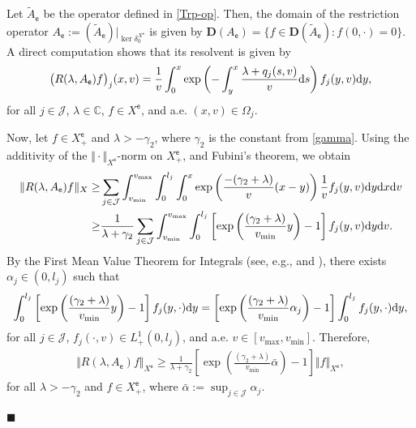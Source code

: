 \documentclass[onecolumn]{autart}
\def\la{\lambda}
\def\calF{{\mathcal{F}}}
\def\C{\mathbb C}
\numberwithin{equation}{section}
\newenvironment{proof}{{\it Proof: \enspace}}{\hfill $\blacksquare$\par}
\begin{document}
	\begin{proof} %
		Let $\tilde{A}_{\mathsf{e}}$ be the operator defined in \eqref{Trp-op}. Then, the domain of the restriction operator ${A}_{\mathsf{e}}:=(\tilde{A}_{\mathsf{e}})\vert_{\ker \delta_{0}^{X^{\mathsf{e}}}}$ is given by
		${\bm D}(A_{\mathsf{e}})= \{ f \in {\bm D}(\tilde{A}_{\mathsf{e}}): f(0,\cdot)=0 \}.$
		A direct computation shows that its resolvent is given by
		\begin{align*}
			\big(R(\lambda,A_{\mathsf{e}}) f\big)_j(x,v)
			= \frac{1}{v} \int_0^x {{\exp}}\left( -\int_y^x \frac{\lambda + q_j(s,v)}{v}  {\rm{d}}s \right) f_j(y,v)  {\rm d}y,
		\end{align*}
		for all $j\in \mathcal{J}$, $\la\in \C$, $f\in X^{\mathsf{e}}$, and a.e. $(x,v)\in \Omega_j$.
		
		Now, let $f\in X_+^{\mathsf{e}}$ and {$\la>-\gamma_2$}, where $\gamma_2$ is the constant from \eqref{gamma}. Using the additivity of the $\Vert\cdot\Vert_{X^{\mathsf{e}}}$-norm on $X_+^{\mathsf{e}}$, and Fubini's theorem, we obtain
		\begin{align*}
			\Vert R(\la,{A}_{{\mathsf{e}}})f\Vert_{X}
			\ge&  \sum_{j\in \mathcal{J}}\int_{v_{\min}}^{v_{\max}}\int_{0}^{l_j} \int_{0}^{x}		{{\exp}}\left(\frac{-(\gamma_2 +\la)}{v}(x-y)\right)\frac{1}{v}f_j(y,v){\rm d}y{\rm d}x{\rm d}v\\
			\ge &	\frac{ 1}{\la +\gamma_2}\sum_{j\in \mathcal{J}}\int_{v_{\min}}^{v_{\max}}\int_{0}^{l_j}     \left[{{\exp}}\left(\frac{(\gamma_2+\la)}{v_{\min}}y\right)-1 \right]f_j(y,v){\rm d}y{\rm d}v.
		\end{align*}
		By the First Mean Value Theorem for Integrals (see, e.g., \cite[Thm. 85.6]{Heuser} and \cite[Rem. 2.1]{Diethelm}), there exists $\alpha_j\in (0,l_j)$ such that
		\begin{align*}
			\displaystyle\int_{0}^{l_j}\left[{{\exp}}\left(\frac{(\gamma_2+\la)}{v_{\min}}y\right)-1\right] f_j(y,\cdot){\rm d}y=
			\left[ {{\exp}}\left(\frac{(\gamma_2+\la)}{v_{\min}}\alpha_j\right)-1\right] \int_{0}^{l_j}f_j(y,\cdot){\rm d}y,
		\end{align*}
		for all $j\in \mathcal{J}$, $ f_j(\cdot,v)\in L^1_+(0,l_j)$, and a.e. $v\in [v_{\max},v_{\min}]$. Therefore,
		\begin{align}\label{inverse-A}
			\Vert R(\la,{A}_{{\mathsf{e}}})f\Vert_{X^{\mathsf{e}}}\ge \frac{1}{\la+\gamma_2}\left[ {{\exp}}\left(\frac{(\gamma_2+\la)}{v_{\min}}\bar{\alpha}\right)-1\right]\Vert f\Vert_{X^{\mathsf{e}}},
		\end{align}
		for all {$\la>-\gamma_2$} and $f\in X_+^{\mathsf{e}}$, where $\bar{\alpha}:=\sup_{j\in \mathcal{J}} \alpha_j$.
		

\end{proof}
\end{document}
